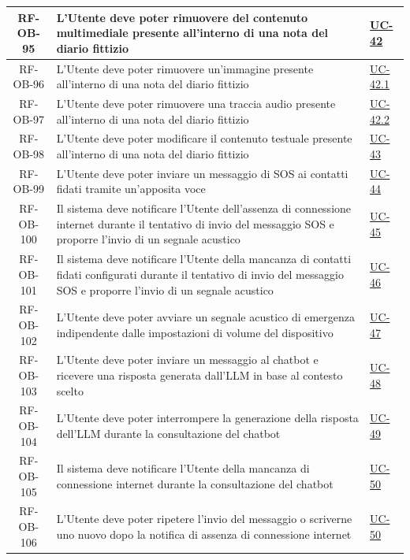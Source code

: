 \documentclass[a4paper,12pt]{article}
\begin{document}
\begin{center}
\begin{longtable}{|c|p{8.5cm}|>{\centering\arraybackslash}p{4cm}|}
\hline
\rowcolor{white}
RF-OB-95 & L'Utente deve poter rimuovere del contenuto multimediale presente all'interno di una nota del diario fittizio & \hyperref[subsec:UC-42]{UC-42} \\
\hline
\rowcolor{gray!20}
RF-OB-96 & L'Utente deve poter rimuovere un'immagine presente all'interno di una nota del diario fittizio & \hyperref[subsec:UC-42.1]{UC-42.1} \\
\hline
\rowcolor{white}
RF-OB-97 & L'Utente deve poter rimuovere una traccia audio presente all'interno di una nota del diario fittizio & \hyperref[subsec:UC-42.2]{UC-42.2} \\
\hline
\rowcolor{gray!20}
RF-OB-98 & L'Utente deve poter modificare il contenuto testuale presente all'interno di una nota del diario fittizio & \hyperref[subsec:UC-43]{UC-43} \\
\hline
\rowcolor{white}
RF-OB-99 & L'Utente deve poter inviare un messaggio di SOS ai contatti fidati tramite un'apposita voce & \hyperref[sec:UC-44]{UC-44} \\
\hline
\rowcolor{gray!20}
RF-OB-100 & Il sistema deve notificare l'Utente dell'assenza di connessione internet durante il tentativo di invio del messaggio SOS e proporre l'invio di un segnale acustico & \hyperref[sec:UC-45]{UC-45} \\
\hline
\rowcolor{white}
RF-OB-101 & Il sistema deve notificare l'Utente della mancanza di contatti fidati configurati durante il tentativo di invio del messaggio SOS e proporre l'invio di un segnale acustico & \hyperref[sec:UC-46]{UC-46} \\
\hline
\rowcolor{gray!20}
RF-OB-102 & L'Utente deve poter avviare un segnale acustico di emergenza indipendente dalle impostazioni di volume del dispositivo & \hyperref[sec:UC-47]{UC-47} \\
\hline
\rowcolor{white}
RF-OB-103 & L'Utente deve poter inviare un messaggio al chatbot e ricevere una risposta generata dall'LLM in base al contesto scelto & \hyperref[sec:UC-48]{UC-48} \\
\hline
\rowcolor{gray!20}
RF-OB-104 & L'Utente deve poter interrompere la generazione della risposta dell'LLM durante la consultazione del chatbot & \hyperref[sec:UC-49]{UC-49} \\
\hline
\rowcolor{white}
RF-OB-105 & Il sistema deve notificare l'Utente della mancanza di connessione internet durante la consultazione del chatbot & \hyperref[sec:UC-50]{UC-50} \\
\hline
\rowcolor{gray!20}
RF-OB-106 & L'Utente deve poter ripetere l'invio del messaggio o scriverne uno nuovo dopo la notifica di assenza di connessione internet & \hyperref[sec:UC-50]{UC-50} \\

\end{longtable}
\end{center}
\end{document}
